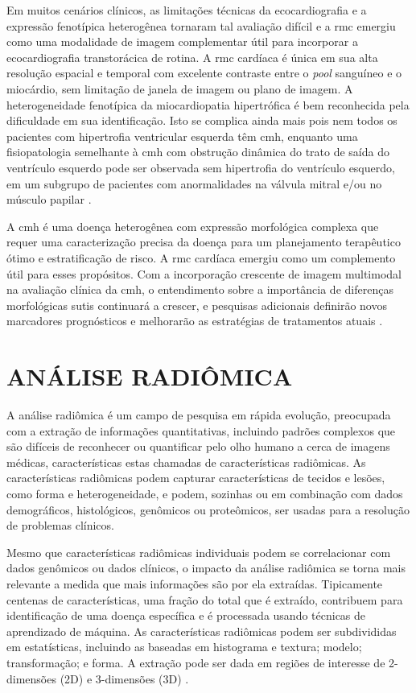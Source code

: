 Em muitos cenários clínicos, as limitações técnicas da ecocardiografia e a expressão fenotípica heterogênea tornaram tal avaliação difícil e a \gls{rmc} emergiu como uma modalidade de imagem complementar útil para incorporar a ecocardiografia transtorácica de rotina. A \gls{rmc} cardíaca é única em sua alta resolução espacial e temporal com excelente contraste entre o \textit{pool} sanguíneo e o miocárdio, sem limitação de janela de imagem ou plano de imagem.
A heterogeneidade fenotípica da miocardiopatia hipertrófica é bem reconhecida pela dificuldade em sua identificação. Isto se complica ainda mais pois nem todos os pacientes com hipertrofia ventricular esquerda têm \gls{cmh}, enquanto uma fisiopatologia semelhante à \gls{cmh} com obstrução dinâmica do trato de saída do ventrículo esquerdo pode ser observada sem hipertrofia do ventrículo esquerdo, em um subgrupo de pacientes com anormalidades na válvula mitral e/ou no músculo papilar \cite{pontoneClinicalApplicationsCardiac2022}.

A \gls{cmh} é uma doença heterogênea com expressão morfológica complexa que requer uma caracterização precisa da doença para um planejamento terapêutico ótimo e estratificação de risco. A \gls{rmc} cardíaca emergiu como um complemento útil para esses propósitos. Com a incorporação crescente de imagem multimodal na avaliação clínica da \gls{cmh}, o entendimento sobre a importância de diferenças morfológicas sutis continuará a crescer, e pesquisas adicionais definirão novos marcadores prognósticos e melhorarão as estratégias de tratamentos atuais \cite{toCardiacMagneticResonance2011c}.

\section{ANÁLISE RADIÔMICA}
\label{sec:analise_radiomica}

A análise radiômica é um campo de pesquisa em rápida evolução, preocupada com a extração de informações quantitativas, incluindo padrões complexos que são difíceis de reconhecer ou quantificar pelo olho humano a cerca de imagens médicas, características estas chamadas de características radiômicas. As características radiômicas podem capturar características de tecidos e lesões, como forma e heterogeneidade, e podem, sozinhas ou em combinação com dados demográficos, histológicos, genômicos ou proteômicos, ser usadas para a resolução de problemas clínicos.

Mesmo que características radiômicas individuais podem se correlacionar com dados genômicos ou dados clínicos, o impacto da análise radiômica se torna mais relevante a medida que mais informações são por ela extraídas. Tipicamente centenas de características, uma fração do total que é extraído, contribuem para identificação de uma doença específica e é processada usando técnicas de aprendizado de máquina. As características radiômicas podem ser subdivididas em estatísticas, incluindo as baseadas em histograma e textura; modelo; transformação; e forma. A extração pode ser dada em regiões de interesse de 2-dimensões (2D) e 3-dimensões (3D)  \cite{mayerhoeferIntroductionRadiomics2020}.


